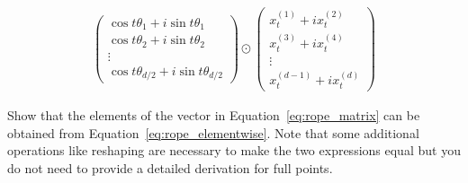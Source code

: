 \begin{parts}
\begin{subparts}
\begin{align}\label{eq:rope_elementwise}
    \begin{pmatrix}
        \cos t\theta_1 + i\sin t\theta_1 \\
        \cos t\theta_2 + i\sin t\theta_2 \\
        \vdots \\
        \cos t\theta_{d/2} + i\sin t\theta_{d/2}
    \end{pmatrix}
    \odot
    \begin{pmatrix}
        x^{(1)}_t + i x^{(2)}_t \\
        x^{(3)}_t + i x^{(4)}_t \\
        \vdots \\
        x^{(d-1)}_t + i x^{(d)}_t
    \end{pmatrix}
\end{align}

Show that the elements of the vector in Equation~\ref{eq:rope_matrix} can be obtained from Equation~\ref{eq:rope_elementwise}. Note that some additional operations like reshaping are necessary to make the two expressions equal but you do not need to provide a detailed derivation for full points. 



\end{subparts}
\end{parts}
